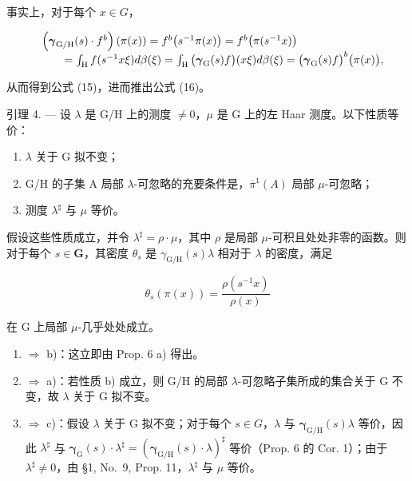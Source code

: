 事实上，对于每个 \(x \in G\)，

\[
\begin{array}{r l} & {\left(\boldsymbol {\gamma} _ {\mathrm{G/H}} (s) \cdot f ^ {b}\right) (\pi (x)) = f ^ {b} \big (s ^ {- 1} \pi (x) \big) = f ^ {b} \big (\pi (s ^ {- 1} x) \big)} \\ & {\qquad = \int_ {\mathrm{H}} f (s ^ {- 1} x \xi) d \beta (\xi) = \int_ {\mathrm{H}} \big (\boldsymbol {\gamma} _ {\mathrm{G}} (s) f \big) (x \xi) d \beta (\xi) = \big (\boldsymbol {\gamma} _ {\mathrm{G}} (s) f \big) ^ {b} \big (\pi (x) \big),} \end{array}
\]

从而得到公式 (15)，进而推出公式 (16)。

引理 4. --- 设 \(\lambda\) 是 G/H 上的测度 \(\neq 0\)，\(\mu\) 是 G 上的左 Haar 测度。以下性质等价：

\begin{enumerate}
\def\labelenumi{\alph{enumi})}
\item
  \(\lambda\) 关于 G 拟不变；
\item
  G/H 的子集 A 局部 \(\lambda\)-可忽略的充要条件是，\(\overline{\pi}^{1}(A)\) 局部 \(\mu\)-可忽略；
\item
  测度 \(\lambda^{\sharp}\) 与 \(\mu\) 等价。
\end{enumerate}

假设这些性质成立，并令 \(\lambda^{\sharp} = \rho \cdot \mu\)，其中 \(\rho\) 是局部 \(\mu\)-可积且处处非零的函数。则对于每个 \(s \in \mathbf{G}\)，其密度 \(\theta_s\) 是 \(\gamma_{\mathrm{G / H}}(s)\lambda\) 相对于 \(\lambda\) 的密度，满足

\[
\theta_ {s} (\pi (x)) = \frac {\rho (s ^ {- 1} x)}{\rho (x)}\tag{17}
\]

在 G 上局部 \(\mu\)-几乎处处成立。

\begin{enumerate}
\def\labelenumi{\alph{enumi})}
\setcounter{enumi}{2}
\item
  \(\Rightarrow\) b)：这立即由 Prop. 6 a) 得出。
\item
  \(\Rightarrow\) a)：若性质 b) 成立，则 G/H 的局部 \(\lambda\)-可忽略子集所成的集合关于 G 不变，故 \(\lambda\) 关于 G 拟不变。
\item
  \(\Rightarrow\) c)：假设 \(\lambda\) 关于 G 拟不变；对于每个 \(s\in G\)，\(\lambda\) 与 \(\pmb{\gamma}_{\mathrm{G / H}}(s)\lambda\) 等价，因此 \(\lambda^{\sharp}\) 与 \(\pmb{\gamma}_{\mathrm{G}}(s)\cdot \lambda^{\sharp} = (\pmb{\gamma}_{\mathrm{G / H}}(s)\cdot \lambda)^{\sharp}\) 等价（Prop. 6 的 Cor. 1）；由于 \(\lambda^{\sharp}\neq 0\)，由 §1, No.~9, Prop. 11，\(\lambda^{\sharp}\) 与 \(\mu\) 等价。
\end{enumerate}

